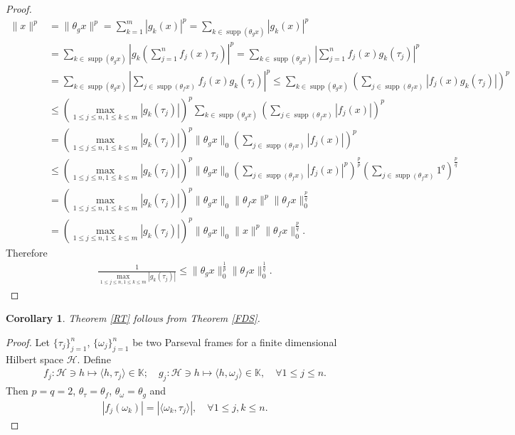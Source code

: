 \documentclass{amsart}
\newtheorem{corollary}[theorem] {Corollary}
\begin{document}
\begin{proof}
\begin{align*}
\|x\|^p&=\|\theta_gx\|^p=\sum_{k=1}^m|g_k(x)|^p=\sum_{k \in \operatorname{supp}(\theta_gx)}|g_k(x)|^p\\
&=\sum_{k\in \operatorname{supp}(\theta_gx)}\left|g_k\left(\sum_{j=1}^nf_j(x)\tau_j\right)\right|^p
=\sum_{k \in \operatorname{supp}(\theta_gx)}\left|\sum_{j=1}^nf_j(x)g_k(\tau_j)\right|^p\\
&=\sum_{k \in \operatorname{supp}(\theta_gx)}\left|\sum_{j\in \operatorname{supp}(\theta_fx)}f_j(x)g_k(\tau_j)\right|^p\leq \sum_{k \in \operatorname{supp}(\theta_gx)}\left(\sum_{j\in \operatorname{supp}(\theta_fx)}|f_j(x)g_k(\tau_j)|\right)^p\\
&\leq \left(\displaystyle\max_{1\leq j\leq n, 1\leq k\leq m}|g_k(\tau_j)|\right)^p\sum_{k \in \operatorname{supp}(\theta_gx)}\left(\sum_{j\in \operatorname{supp}(\theta_fx)}|f_j(x)|\right)^p\\
&=\left(\displaystyle\max_{1\leq j\leq n, 1\leq k\leq m}|g_k(\tau_j)|\right)^p\|\theta_g x\|_0\left(\sum_{j\in \operatorname{supp}(\theta_fx)}|f_j(x)|\right)^p\\
&\leq \left(\displaystyle\max_{1\leq j\leq n, 1\leq k\leq m}|g_k(\tau_j)|\right)^p\|\theta_g x\|_0\left(\sum_{j\in \operatorname{supp}(\theta_fx)}|f_j(x)|^p\right)^\frac{p}{p}\left(\sum_{j\in \operatorname{supp}(\theta_fx)}1^q\right)^\frac{p}{q}\\
&=\left(\displaystyle\max_{1\leq j\leq n, 1\leq k\leq m}|g_k(\tau_j)|\right)^p\|\theta_g x\|_0\|\theta_f x\|^p\|\theta_f x\|_0^\frac{p}{q}\\
&=\left(\displaystyle\max_{1\leq j\leq n, 1\leq k\leq m}|g_k(\tau_j)|\right)^p\|\theta_g x\|_0\|x\|^p\|\theta_f x\|_0^\frac{p}{q}.
\end{align*}
Therefore 
\begin{align*}
\frac{1}{\displaystyle\max_{1\leq j\leq n, 1\leq k\leq m}|g_k(\tau_j)|}\leq \|\theta_g x\|_0^\frac{1}{p}\|\theta_f x\|_0^\frac{1}{q}.
\end{align*}
\end{proof}
\begin{corollary}
	Theorem \ref{RT} follows from Theorem \ref{FDS}.
\end{corollary}
\begin{proof}
	Let $\{\tau_j\}_{j=1}^n$,  $\{\omega_j\}_{j=1}^n$ be two Parseval frames   for a  finite dimensional Hilbert space $\mathcal{H}$.	Define 
	\begin{align*}
		f_j:\mathcal{H} \ni h \mapsto \langle h, \tau_j \rangle \in \mathbb{K}; \quad g_j:\mathcal{H} \ni h \mapsto \langle h, \omega_j \rangle \in \mathbb{K}, \quad \forall 1\leq j\leq n.
	\end{align*}
Then $p=q=2$, $\theta_\tau=\theta_f$, $\theta_\omega=\theta_g$ and 
\begin{align*}
|f_j(\omega_k)|=|\langle \omega_k, \tau_j \rangle |, \quad \forall 1\leq j, k \leq n.
\end{align*}
\end{proof}
\end{document}
